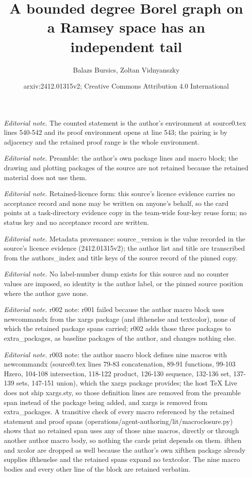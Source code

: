 \documentclass[10pt,a4paper]{article}
\title{A bounded degree Borel graph on a Ramsey space has an independent tail}
\author{Balazs Bursics, Zoltan Vidnyanszky}
\date{arxiv:2412.01315v2; Creative Commons Attribution 4.0 International}
\theoremstyle{definition}
\numberwithin{equation}{section}
\begin{document}
\maketitle
\noindent\textit{Editorial note.} The counted statement is the author's environment at source0.tex lines 540-542 and its proof environment opens at line 543; the pairing is by adjacency and the retained proof range is the whole environment.\par\medskip
\noindent\textit{Editorial note.} Preamble: the author's own package lines and macro block; the drawing and plotting packages of the source are not retained because the retained material does not use them.\par\medskip
\noindent\textit{Editorial note.} Retained-licence form: this source's licence evidence carries no acceptance record and none may be written on anyone's behalf, so the card points at a task-directory evidence copy in the team-wide four-key reuse form; no status key and no acceptance record are written.\par\medskip
\noindent\textit{Editorial note.} Metadata provenance: source\_version is the value recorded in the source's licence evidence (2412.01315v2); the author list and title are transcribed from the authors\_index and title keys of the source record of the pinned copy.\par\medskip
\noindent\textit{Editorial note.} No label-number dump exists for this source and no counter values are imposed, so identity is the author label, or the pinned source position where the author gave none.\par\medskip
\noindent\textit{Editorial note.} r002 note: r001 failed because the author macro block uses newcommandx from the xargs package (and ifthenelse and textcolor), none of which the retained package spans carried; r002 adds those three packages to extra\_packages, as baseline packages of the author, and changes nothing else.\par\medskip
\noindent\textit{Editorial note.} r003 note: the author macro block defines nine macros with newcommandx (source0.tex lines 79-83 concatenation, 89-91 functions, 99-103 Hzero, 104-108 intersection, 118-122 product, 126-130 sequence, 132-136 set, 137-139 sets, 147-151 union), which the xargs package provides; the host TeX Live does not ship xargs.sty, so those definition lines are removed from the preamble span instead of the package being added, and xargs is removed from extra\_packages. A transitive check of every macro referenced by the retained statement and proof spans (operations/agent-authoring/lit/macroclosure.py) shows that no retained span uses any of those nine macros, directly or through another author macro body, so nothing the cards print depends on them. ifthen and xcolor are dropped as well because the author's own xifthen package already supplies ifthenelse and the retained spans expand no textcolor. The nine macro bodies and every other line of the block are retained verbatim.\par\medskip
\end{document}
